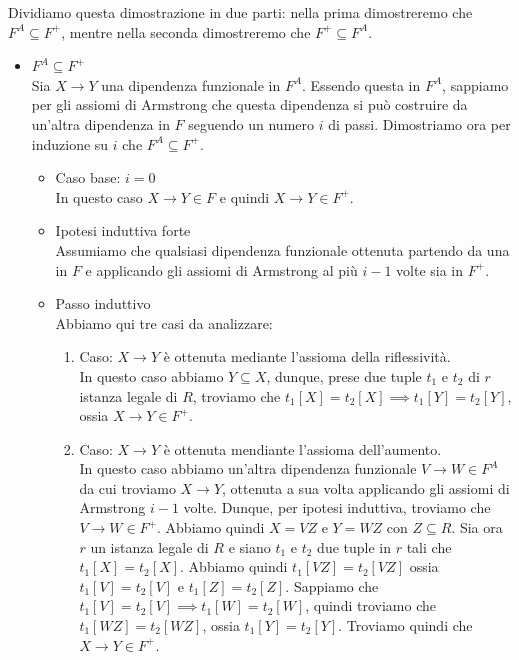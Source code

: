 \documentclass[11pt, a4paper, titlepage, oneside]{scrbook}
\begin{document}
\Dimostrazione \nopagebreak

Dividiamo questa dimostrazione in due parti: nella prima dimostreremo che $F^A \subseteq F^+$, mentre nella seconda dimostreremo che $F^+ \subseteq F^A$.

\begin{itemize}
    \item $F^A \subseteq F^+$ \\
    Sia $X \longrightarrow Y$ una dipendenza funzionale in $F^A$. Essendo questa in $F^A$, sappiamo per gli assiomi di Armstrong che questa dipendenza si può costruire da un'altra dipendenza in $F$ seguendo un numero $i$ di passi. Dimostriamo ora per induzione su $i$ che $F^A \subseteq F^+$. 
    \begin{itemize}
        \item Caso base: $i = 0$ \\
        In questo caso $X \longrightarrow Y \in F$ e quindi $X \longrightarrow Y \in F^+$.
        \item Ipotesi induttiva forte \\
        Assumiamo che qualsiasi dipendenza funzionale ottenuta partendo da una in $F$ e applicando gli assiomi di Armstrong al più $i-1$ volte sia in $F^+$.
        \item Passo induttivo \\
        Abbiamo qui tre casi da analizzare:
        \begin{enumerate}[label=\arabic*°]
            \item Caso: $X \longrightarrow Y$ è ottenuta mediante l'assioma della riflessività. \\
            In questo caso abbiamo $Y \subseteq X$, dunque, prese due tuple $t_1$ e $t_2$ di $r$ istanza legale di $R$, troviamo che $t_1[X] = t_2[X] \implies t_1[Y] = t_2[Y]$, ossia $X \longrightarrow Y \in F^+$.
            \item Caso: $X \longrightarrow Y$ è ottenuta mendiante l'assioma dell'aumento. \\
            In questo caso abbiamo un'altra dipendenza funzionale $V \longrightarrow W \in F^A$ da cui troviamo $X \longrightarrow Y$, ottenuta a sua volta applicando gli assiomi di Armstrong $i-1$ volte. Dunque, per ipotesi induttiva, troviamo che $V \longrightarrow W \in F^+$. Abbiamo quindi $X = VZ$ e $Y = WZ$ con $Z \subseteq R$. Sia ora $r$ un istanza legale di $R$ e siano $t_1$ e $t_2$ due tuple in $r$ tali che $t_1[X] = t_2[X]$. Abbiamo quindi $t_1[VZ] = t_2[VZ]$ ossia $t_1[V] = t_2[V]$ e $t_1[Z] = t_2[Z]$. Sappiamo che $t_1[V] = t_2[V] \implies t_1[W] = t_2[W]$, quindi troviamo che $t_1[WZ] = t_2[WZ]$, ossia $t_1[Y] = t_2[Y]$. Troviamo quindi che $X \longrightarrow Y \in F^+$.

\end{enumerate}
\end{itemize}
\end{itemize}
\end{document}
